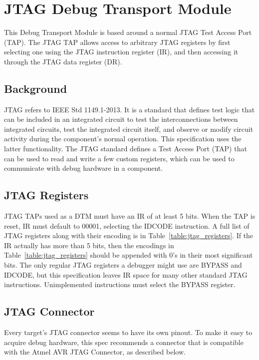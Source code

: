 \chapter{JTAG Debug Transport Module} \label{jtagdtm}

This Debug Transport Module is based around a normal JTAG Test Access Port
(TAP).  The JTAG TAP allows access to arbitrary JTAG registers by first
selecting one using the JTAG instruction register (IR), and then accessing it
through the JTAG data register (DR).

\section{Background}

JTAG refers to IEEE Std 1149.1-2013. It is a standard that defines test logic
that can be included in an integrated circuit to test the interconnections
between integrated circuits, test the integrated circuit itself, and observe or
modify circuit activity during the component’s normal operation.
This specification uses the latter functionality.
The JTAG standard defines a Test Access Port (TAP) that
can be used to read and write a few custom registers, which can be used to
communicate with debug hardware in a component.

\section{JTAG Registers}

JTAG TAPs used as a DTM must have an IR of at least 5 bits.
When the TAP is reset, IR must default to
00001, selecting the IDCODE instruction. A full list of JTAG registers along
with their encoding is in Table~\ref{table:jtag_registers}.
If the IR actually has more than 5 bits, then the encodings in
Table~\ref{table:jtag_registers} should be appended with 0's in their
most significant bits.
The only regular JTAG registers a debugger might use are BYPASS and IDCODE, but this
specification leaves IR space for many other standard JTAG instructions.
Unimplemented instructions must select the BYPASS register.



\section{JTAG Connector}

Every target's JTAG connector seems to have its own pinout. To make it easy to
acquire debug hardware, this spec recommends a connector that is compatible
with the Atmel AVR JTAG Connector, as described below.

